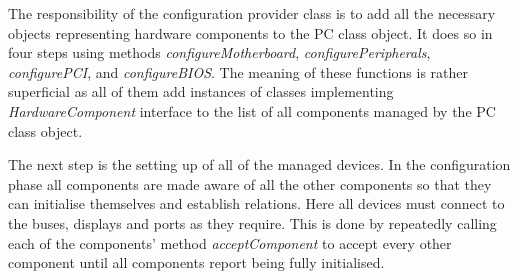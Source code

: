 The responsibility of the configuration provider class is to add all the
necessary objects representing hardware components to the PC class object. It
does so in four steps using methods \emph{configureMotherboard},
\emph{configurePeripherals}, \emph{configurePCI}, and \emph{configureBIOS}. The
meaning of these functions is rather superficial as all of them add instances
of classes implementing \emph{HardwareComponent} interface to the list of all
components managed by the PC class object.


\begin{codeblock}
    
\end{codeblock}

%
%
%


The next step is the setting up of all of the managed devices. In the
configuration phase all components are made aware of all the other components
so that they can initialise themselves and establish relations. Here all
devices must connect to the buses, displays and ports as they require. This is
done by repeatedly calling each of the components' method \emph{acceptComponent} to
accept every other component until all components report being fully
initialised.

\begin{codeblock}
    
\end{codeblock}
            
